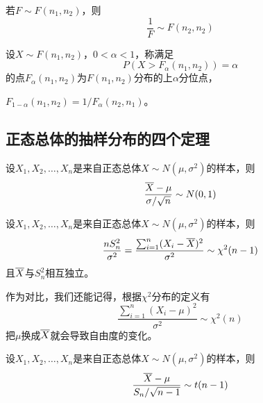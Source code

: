 \begin{theorem}[$F$分布的性质]
  若$F\sim F(n_1,n_2)$，则
  \begin{displaymath}
    \frac{1}{F} \sim F(n_2,n_2)
  \end{displaymath}
\end{theorem}

\begin{definition}
  设$X\sim F(n_1,n_2)$，$0<\alpha<1$，称满足
  \begin{displaymath}
    P(X>F_\alpha(n_1,n_2)) = \alpha
  \end{displaymath}
  的点$F_\alpha(n_1,n_2)$为$F(n_1,n_2)$分布的上$\alpha$分位点，
\end{definition}

\begin{theorem}
  $F_{1-\alpha}(n_1,n_2) = 1/F_\alpha(n_2,n_1)$。
\end{theorem}

\subsection{正态总体的抽样分布的四个定理}
\begin{theorem}[样本均值的分布]
  设$X_1,X_2,\dots,X_n$是来自正态总体$X\sim N(\mu,\sigma^2)$的样本，则
  \begin{displaymath}
    \frac{\overline{X}-\mu}{\sigma/\sqrt{n}}\sim N(0,1)
  \end{displaymath}
\end{theorem}

\begin{theorem}[样本方差的分布]
  设$X_1,X_2,\dots,X_n$是来自正态总体$X\sim N(\mu,\sigma^2)$的样本，则
  \begin{displaymath}
    \frac{nS_n^2}{\sigma^2} =
    \frac{\sum_{i=1}^n(X_i-\overline{X})^2}{\sigma^2} \sim \chi^2(n-1)
  \end{displaymath}
  且$\overline{X}$与$S_n^2$相互独立。
\end{theorem}

\begin{remark}
  作为对比，我们还能记得，根据$\chi^2$分布的定义有
  \begin{displaymath}
    \frac{\sum_{i=1}^n(X_i-\mu)^2}{\sigma^2} \sim \chi^2(n)
  \end{displaymath}
  把$\mu$换成$\overline{X}$就会导致自由度的变化。
\end{remark}

\begin{theorem}[样本均值和样本方差的分布]
  设$X_1,X_2,\dots,X_n$是来自正态总体$X\sim N(\mu,\sigma^2)$的样本，则
  \begin{displaymath}
    \frac{\overline{X}-\mu}{S_n/\sqrt{n-1}}\sim t(n-1)
  \end{displaymath}
\end{theorem}

